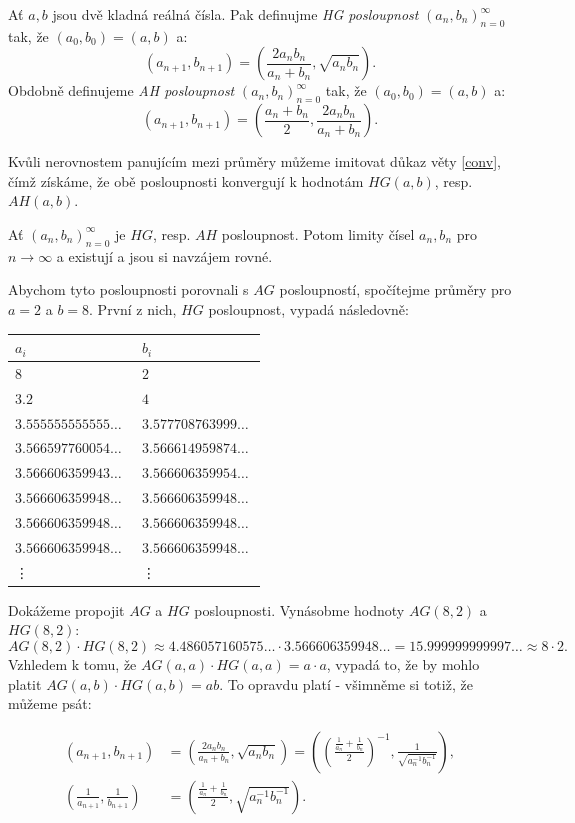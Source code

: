 \documentclass[12pt]{report}
\begin{document}
\begin{definice}
Ať $a,b$ jsou dvě kladná reálná čísla. Pak definujme \textit{HG posloupnost} $(a_n,b_n)_{n=0}^{\infty}$ tak, že $(a_0,b_0) = (a,b)$ a:
$$\left(a_{n+1},b_{n+1} \right) = \left( \frac{2 a_n b_n}{a_n+b_n} , \sqrt{a_n b_n} \right).$$
Obdobně definujeme \textit{AH posloupnost}  $(a_n,b_n)_{n=0}^{\infty}$ tak, že $(a_0,b_0) = (a,b)$ a:
$$\left(a_{n+1},b_{n+1} \right) = \left( \frac{a_n+b_n}{2}, \frac{2 a_n b_n}{a_n+b_n} \right).$$
\end{definice}
Kvůli nerovnostem panujícím mezi průměry můžeme imitovat důkaz věty \ref{conv}, čímž získáme, že obě posloupnosti konvergují k hodnotám $HG(a,b)$, resp. $AH(a,b)$.

\begin{veta}
Ať $(a_n,b_n)_{n=0}^{\infty}$ je $HG$, resp. $AH$ posloupnost. Potom limity čísel $a_n,b_n$ pro $n \rightarrow \infty$ a existují a jsou si navzájem rovné.
\end{veta}

 Abychom tyto posloupnosti porovnali s $AG$ posloupností, spočítejme průměry pro $a=2$ a $b=8$. První z nich, $HG$ posloupnost, vypadá následovně:
\begin{longtable}[H]{>{\raggedright\arraybackslash}p{0.3\linewidth}p{0.202\linewidth}}
\toprule
$a_i$ & $b_i$\\
\midrule
$8$ & \noindent $2$\\
$3.2$ & \noindent $4$\\
$3.555555555555\dots$ & $3.577708763999\dots$\\
$3.566597760054\dots$ & $3.566614959874\dots$\\
$3.566606359943\dots$ & $3.566606359954\dots$\\ 
$3.566606359948\dots$ & $3.566606359948\dots$\\
$3.566606359948\dots$ & $3.566606359948\dots$\\
$3.566606359948\dots$ & $3.566606359948\dots$\\
\vdots & \vdots\\
\bottomrule 
\end{longtable} 
Dokážeme propojit $AG$ a $HG$ posloupnosti. Vynásobme hodnoty $AG(8,2)$ a $HG(8,2)$:
$$AG(8,2) \cdot HG(8,2) \approx 4.486057160575\dots \cdot 3.566606359948\dots = 15.999999999997\dots \approx 8 \cdot 2.$$
Vzhledem k tomu, že $AG(a,a) \cdot HG(a,a) = a \cdot a$, vypadá to, že by mohlo platit $AG(a,b) \cdot HG(a,b) = ab$. To opravdu platí - všimněme si totiž, že můžeme psát:

\begin{align*}
\left(a_{n+1}, b_{n+1} \right) &= \left( \frac{2 a_n b_n}{a_n + b_n}, \sqrt{a_n b_n} \right) = \left( \left(\frac{\frac{1}{a_n}+ \frac{1}{b_n}}{2} \right)^{-1},\frac{1}{ \sqrt{a_n ^{-1} b_n ^{-1}}}  \right),\\
\left(\frac{1}{a_{n+1}}, \frac{1}{b_{n+1}} \right) &= \left(\frac{\frac{1}{a_n}+ \frac{1}{b_n}}{2} , \sqrt{a_n ^{-1} b_n ^{-1}}  \right).
\end{align*}
\end{document}
